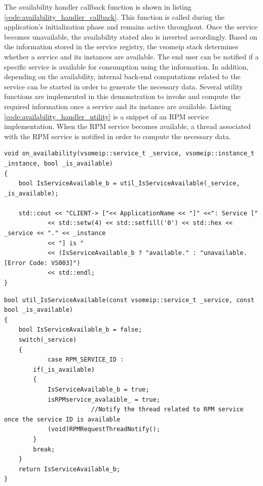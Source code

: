 The availability handler callback function is shown in listing \ref{code:availability_handler_callback}. This function is called during the application's initialization phase and remains active throughout. Once the service becomes unavailable, the availability stated also is inverted accordingly. Based on the information stored in the service registry, the vsomeip stack determines whether a service and its instances are available. The end user can be notified if a specific service is available for consumption using the information. In addition, depending on the availability, internal back-end computations related to the service can be started in order to generate the necessary data. Several utility functions are implemented in this demonstration to invoke and compute the required information once a service and its instance are available. Listing \ref{code:availability_handler_utility} is a snippet of an RPM service implementation. When the RPM service becomes available, a thread associated with the RPM service is notified in order to compute the necessary data.
 
\begin{lstlisting}[caption={vsomeip availability handler callback function}, label=code:availability_handler_callback]
void on_availability(vsomeip::service_t _service, vsomeip::instance_t _instance, bool _is_available)
{
    bool IsServiceAvailable_b = util_IsServiceAvailable(_service, _is_available);

    std::cout << "CLIENT-> ["<< ApplicationName << "]" <<": Service ["
            << std::setw(4) << std::setfill('0') << std::hex << _service << "." << _instance
            << "] is "
            << (IsServiceAvailable_b ? "available." : "unavailable. [Error Code: VS003]")
            << std::endl;
}
\end{lstlisting}

\begin{lstlisting}[caption={availability handler utility function}, label=code:availability_handler_utility]
bool util_IsServiceAvailable(const vsomeip::service_t _service, const bool _is_available)
{
    bool IsServiceAvailable_b = false;
    switch(_service)
    {
			case RPM_SERVICE_ID :
        if(_is_available)
        {
            IsServiceAvailable_b = true;
            isRPMservice_avalaible_ = true;
						//Notify the thread related to RPM service once the service ID is available
            (void)RPMRequestThreadNotify();
        }
        break;
    }
    return IsServiceAvailable_b;
}
\end{lstlisting}

